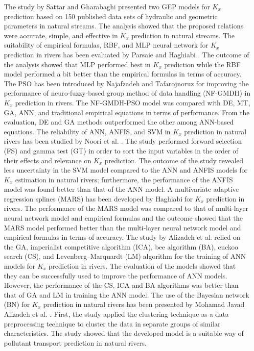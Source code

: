 \documentclass[a4paper,12pt, english]{article}
\begin{document}
The study by Sattar and Gharabaghi \cite{sattar2015gene} presented two GEP models for $K_x$ prediction based on 150 published data sets of hydraulic and geometric parameters in natural streams. The analysis showed that the proposed relations were accurate, simple, and effective in $K_x$ prediction in natural streams. The suitability of empirical formulas, RBF, and MLP neural network for $K_x$ prediction in rivers has been evaluated by Parsaie and Haghiabi \cite{parsaie2015predicting}. The outcome of the analysis showed that MLP performed best in $K_x$ prediction while the RBF model performed a bit better than the empirical formulas in terms of accuracy. The PSO has been introduced by Najafzadeh and Tafarojnoruz \cite{najafzadeh2016evaluation} for improving the performance of neuro-fuzzy-based group method of data handling (NF-GMDH) in $K_x$ prediction in rivers. The NF-GMDH-PSO model was compared with DE, MT, GA, ANN, and traditional empirical equations in terms of performance. From the evaluation, DE and GA methods outperformed the other among ANN-based equations. The reliability of ANN, ANFIS, and SVM in $K_x$ prediction in natural rivers has been studied by Noori et al. \cite{noori2016reliable}. The study performed forward selection (FS) and gamma test (GT) in order to sort the input variables in the order of their effects and relevance on $K_x$ prediction. The outcome of the study revealed less uncertainty in the SVM model compared to the ANN and ANFIS models for $K_x$ estimation in natural rivers; furthermore, the performance of the ANFIS model was found better than that of the ANN model. A multivariate adaptive regression splines (MARS) has been developed by Haghiabi \cite{haghiabi2016prediction} for $K_x$ prediction in rivers. The performance of the MARS model was compared to that of multi-layer neural network model and empirical formulas and the outcome showed that the MARS model performed better than the multi-layer neural network model and empirical formulas in terms of accuracy. The study by Alizadeh et al. \cite{alizadeh2017predicting} relied on the GA, imperialist competitive algorithm (ICA), bee algorithm (BA), cuckoo search (CS), and Levenberg–Marquardt (LM) algorithm for the training of ANN models for $K_x$ prediction in rivers. The evaluation of the models showed that they can be successfully used to improve the performance of ANN models. However, the performance of the CS, ICA and BA algorithms was better than that of GA and LM in training the ANN model. The use of the Bayesian network (BN) for $K_x$ prediction in natural rivers has been presented by Mohamad Javad Alizadeh et al. \cite{alizadeh2017prediction}. First, the study applied the clustering technique as a data preprocessing technique to cluster the data in separate groups of similar characteristics. The study showed that the developed model is a suitable way of pollutant transport prediction in natural rivers.
\end{document}
